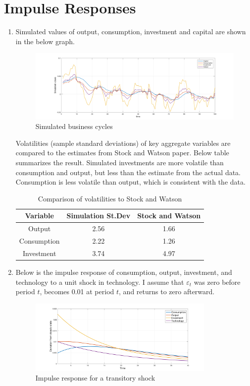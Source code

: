 \documentclass[11pt]{amsart}
\begin{document}
\section{Impulse Responses}
\begin{enumerate}[label = (\alph*)]
	\item Simulated values of output, consumption, investment and capital are shown in the below graph. 
	\begin{figure}[H]
		\centering
		\includegraphics[width=1\textwidth]{5a_Minki.png}
		\caption{Simulated business cycles}
	\end{figure}
    Volatilities (sample standard deviations) of key aggregate variables are compared to the estimates from Stock and Watson paper. Below table summarizes the result. Simulated investments are more volatile than consumption and output, but less than the estimate from the actual data. Consumption is less volatile than output, which is consistent with the data. 
    \begin{table}[H]
    	\centering
    	\begin{tabular}{ccc}
    		\hline \hline 
    		 \bf Variable  & \bf Simulation St.Dev           & \bf Stock and Watson \\
    		\hline 
    	    Output                &  2.56       &   1.66      \\
    		Consumption      &   2.22      &   1.26         \\
    	    Investment         &   3.74      &    4.97       \\
    		\hline
    	\end{tabular}
    	\caption{Comparison of volatilities to Stock and Watson }
    \end{table}
    
    
    \item Below is the impulse response of consumption, output, investment, and technology to a unit shock in technology. I assume that $\varepsilon_t$ was zero before period $t$, becomes 0.01 at period $t$, and returns to zero afterward. 
    \begin{figure}[H]
    	\centering
    	\includegraphics[width=0.85\textwidth]{5b_Minki.png}
    	\caption{Impulse response for a transitory shock}
    \end{figure}
    

\end{enumerate}
\end{document}
